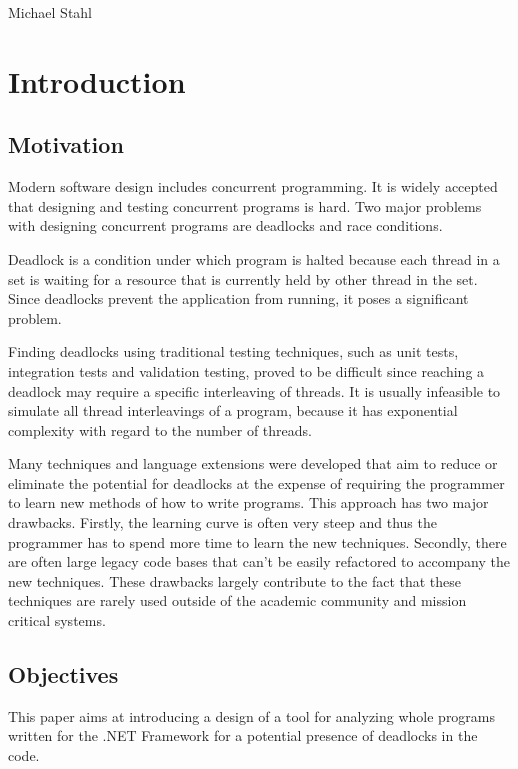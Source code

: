%
         {Michael Stahl}
\chapter{Introduction}

\section{Motivation}

Modern software design includes concurrent programming. It is widely accepted that designing and testing concurrent programs is hard. Two major problems with designing concurrent programs are deadlocks and race conditions.

Deadlock is a condition under which program is halted because each thread in a set is waiting for a resource that is currently held by other thread in the set. Since deadlocks prevent the application from running, it poses a significant problem.

Finding deadlocks using traditional testing techniques, such as unit tests, integration tests and validation testing, proved to be difficult since reaching a deadlock may require a specific interleaving of threads. It is usually infeasible to simulate all thread interleavings of a program, because it has exponential complexity with regard to the number of threads.

Many techniques \citep{Hewitt1973} and language extensions \citep{Agarwal2006,Permandla2007} were developed that aim to reduce or eliminate the potential for deadlocks at the expense of requiring the programmer to learn new methods of how to write programs. This approach has two major drawbacks. Firstly, the learning curve is often very steep and thus the programmer has to spend more time to learn the new techniques. Secondly, there are often large legacy code bases that can't be easily refactored to accompany the new techniques. These drawbacks largely contribute to the fact that these techniques are rarely used outside of the academic community and mission critical systems.

\section{Objectives}

This paper aims at introducing a design of a tool for analyzing whole programs written for the .NET Framework for a potential presence of deadlocks in the code.

